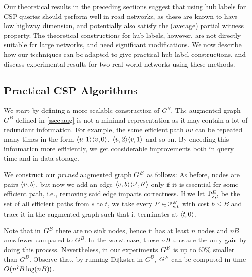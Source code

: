 Our theoretical results in the preceding sections suggest that using hub labels for CSP queries should perform well in road networks, as these are known to have low highway dimension, and potentially also satisfy the (average) partial witness property. The theoretical constructions for hub labels, however, are not directly suitable for large networks, and need significant modifications. We now describe how our techniques can be adapted to give practical hub label constructions, and discuss experimental results for two real world networks using these methods. 
\subsection{Practical CSP Algorithms} 
\label{ssec:practical}

We start by defining a more scalable construction of $G^B$.
The augmented graph $G^B$ defined in \cref{ssec:aug} is not a minimal representation as it may contain a lot of redundant information.
For example, the same efficient path $uv$ can be repeated many times in the form $\langle u,1\rangle\langle v,0\rangle$, $\langle u,2\rangle\langle v,1\rangle$ and so on.
By encoding this information more efficiently, we get considerable improvements both in query time and in data storage.

We construct our \emph{pruned} augmented graph $\tilde G^B$ as follows:
As before, nodes are pairs $\langle v,b\rangle$, but now we add an edge $\langle v,b\rangle\langle v',b'\rangle$ only if it is essential for some efficient path, i.e., removing said edge impacts correctness.
If we let $\mathcal{P}_{s,t}^E$ be the set of all efficient paths from $s$ to $t$, we take every $P\in \mathcal{P}_{s,t}^E$ with cost $b\leq B$ and trace it in the augmented graph such that it terminates at $\langle t,0\rangle$.

Note that in $\tilde G^B$ there are no sink nodes, hence it has at least $n$ nodes and $nB$ arcs fewer compared to $G^B$.
In the worst case, those $nB$ arcs are the only gain by doing this process.
Nevertheless, in our experiments $\tilde G^B$ is up to 60\% smaller than $G^B$.
Observe that, by running Dijkstra in $G^B$, $\tilde G^B$ can be computed in time $O(n^2B\log(nB))$.

